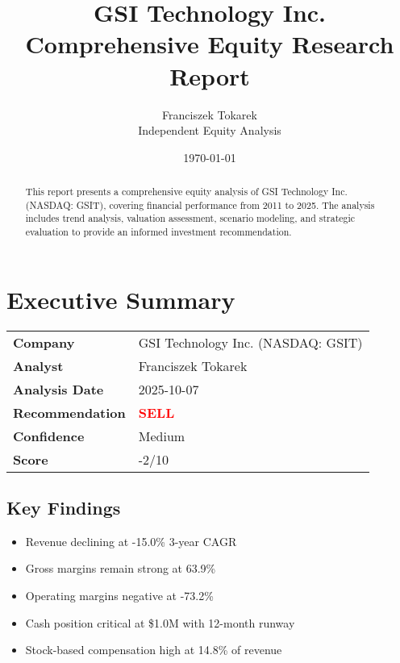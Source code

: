 \documentclass[11pt,a4paper]{article}
\title{\Huge\bfseries GSI Technology Inc. \\ \Large Comprehensive Equity Research Report}
\author{\Large Franciszek Tokarek \\ \normalsize Independent Equity Analysis}
\date{\today}
\begin{document}
\maketitle
\thispagestyle{empty}

\begin{abstract}
This report presents a comprehensive equity analysis of GSI Technology Inc. (NASDAQ: GSIT), 
covering financial performance from 2011 to 2025. The analysis includes trend analysis, 
valuation assessment, scenario modeling, and strategic evaluation to provide an informed 
investment recommendation.
\end{abstract}

\newpage

\tableofcontents

\newpage

\section{Executive Summary}

\vspace{0.5cm}

\begin{center}
\begin{tabular}{ll}
\toprule
\textbf{Company} & GSI Technology Inc. (NASDAQ: GSIT) \\
\textbf{Analyst} & Franciszek Tokarek \\
\textbf{Analysis Date} & 2025-10-07 \\
\textbf{Recommendation} & \textcolor{red}{\textbf{SELL}} \\
\textbf{Confidence} & Medium \\
\textbf{Score} & -2/10 \\
\bottomrule
\end{tabular}
\end{center}

\vspace{0.5cm}

\subsection{Key Findings}

\begin{itemize}
\itemsep0.3em
\item Revenue declining at -15.0\% 3-year CAGR
\item Gross margins remain strong at 63.9\%
\item Operating margins negative at -73.2\%
\item Cash position critical at \$1.0M with 12-month runway
\item Stock-based compensation high at 14.8\% of revenue
\end{itemize}
\end{document}
